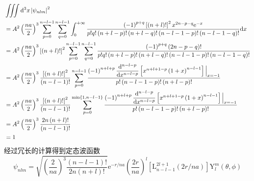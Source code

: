 \documentclass[12pt, a4paper, oneside]{ctexart}
\begin{document}
	\begin{align}
		&\iiint\mathrm{d}^{3}x\left|\psi_{nlm}\right|^{2}\\&=A^{2}\left(\dfrac{na}{2}\right)^{3}\sum_{p=0}^{n-l-1}\sum_{q=0}^{n-l-1}\int_{0}^{+\infty}\dfrac{\left(-1\right)^{p+q}\left[\left(n+l\right)!\right]^{2}x^{2n-p-q}\mathrm{e}^{-x}}{p!q!\left(n+l-p\right)!\left(n+l-q\right)!\left(n-l-1-p\right)!\left(n-l-1-q\right)!}\mathrm{d}x\\
		&=A^{2}\left(\dfrac{na}{2}\right)^{3}\left[\left(n+l\right)!\right]^{2}\sum_{p=0}^{n-l-1}\sum_{q=0}^{n-l-1}\dfrac{\left(-1\right)^{p+q}\left(2n-p-q\right)!}{p!q!\left(n+l-p\right)!\left(n+l-q\right)!\left(n-l-1-p\right)!\left(n-l-1-q\right)!}\\
		&=A^{2}\left(\dfrac{na}{2}\right)^{3}\dfrac{\left[\left(n+l\right)!\right]^{2}}{\left(n-l-1\right)!}\sum_{p=0}^{n-l-1}\dfrac{\left(-1\right)^{n+l+p}\dfrac{\mathrm{d}^{n-l-p}}{\mathrm{d}x^{n-l-p}}\left[x^{n+l+1-p}\left(1+x\right)^{n-l-1}\right]\Big{|}_{x=-1}}{p!\left(n-l-1-p\right)!\left(n+l-p\right)!}\\		&=A^{2}\left(\dfrac{na}{2}\right)^{3}\dfrac{\left[\left(n+l\right)!\right]^{2}}{\left(n-l-1\right)!}\sum_{p=0}^{\min\left\{1,n-l-1\right\}}\dfrac{\left(-1\right)^{n+l+p}\dfrac{\mathrm{d}^{n-l-p}}{\mathrm{d}x^{n-l-p}}\left[x^{n+l+1-p}\left(1+x\right)^{n-l-1}\right]\Big{|}_{x=-1}}{p!\left(n-l-1-p\right)!\left(n+l-p\right)!}\\
		&=A^{2}\left(\dfrac{na}{2}\right)^{3}\dfrac{2n\left(n+l\right)!}{\left(n-l-1\right)!}\\
		&=1
	\end{align}
	\quad\quad 经过冗长的计算得到定态波函数
	\begin{equation}
		\psi_{nlm}=\sqrt{\left(\frac{2}{n a}\right)^{3} \frac{(n-l-1)!}{2 n(n+l)!}} \mathrm{e}^{-r / n a}\left(\frac{2 r}{n a}\right)^{l}\left[\mathrm{L}_{n-l-1}^{2 l+1}(2 r / n a)\right] \mathrm{Y}_{l}^{m}(\theta, \phi)
	\end{equation}
	
\end{document}
